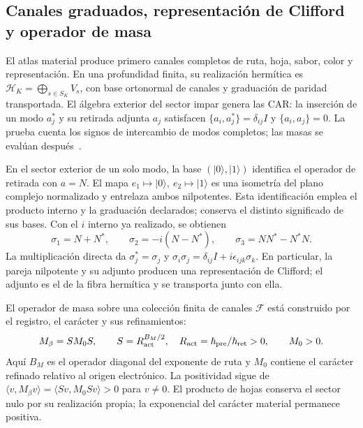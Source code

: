 \subsection{Canales graduados, representación de Clifford y operador de masa}

El atlas material produce primero canales completos de ruta, hoja, sabor,
color y representación. En una profundidad finita, su realización
hermítica es \(\mathcal H_K=\bigoplus_{s\in S_K}V_s\), con base
ortonormal de canales y graduación de paridad transportada. El álgebra
exterior del sector impar genera las CAR: la inserción de un modo
\(a_j^*\) y su retirada adjunta \(a_j\) satisfacen
\(\{a_i,a_j^*\}=\delta_{ij}I\) y \(\{a_i,a_j\}=0\).
La prueba cuenta los signos de intercambio de modos completos; las masas
se evalúan después~\cite{hmtVI}.

En el sector exterior de un solo modo, la base \((|0\rangle,|1\rangle)\)
identifica el operador de retirada con
\(a=N\). El mapa \(e_1\mapsto|0\rangle,\ e_2\mapsto|1\rangle\)
es una isometría del plano complejo normalizado y entrelaza ambos
nilpotentes. Esta identificación emplea el producto interno y la
graduación declarados; conserva el distinto significado de sus bases.
Con el \(i\) interno ya realizado, se obtienen
\begin{equation}
 \sigma_1=N+N^*,\qquad
 \sigma_2=-i(N-N^*),\qquad
 \sigma_3=NN^*-N^*N.
 \label{eq:hc-pauli}
\end{equation}
La multiplicación directa da
\(\sigma_j^*=\sigma_j\) y
\(\sigma_i\sigma_j=\delta_{ij}I+i\epsilon_{ijk}\sigma_k\).
En particular, la pareja nilpotente y su adjunto producen una
representación de Clifford; el adjunto es el de la fibra hermítica y
se transporta junto con ella.

El operador de masa sobre una colección finita de canales \(\mathcal F\)
está construido por el registro, el carácter y sus refinamientos:
\begin{equation}
 M_\beta=S M_0 S,\qquad
 S=R_{\rm act}^{B_M/2},\quad
 R_{\rm act}=\hbar_{\rm pre}/\hbar_{\rm ret}>0,
 \qquad M_0>0.
 \label{eq:hc-mass}
\end{equation}
Aquí \(B_M\) es el operador diagonal del exponente de ruta y \(M_0\)
contiene el carácter refinado relativo al origen electrónico.
La positividad sigue de \(\langle v,M_\beta v\rangle
=\langle Sv,M_0Sv\rangle>0\) para \(v\ne0\).
El producto de hojas conserva el sector nulo por su realización propia;
la exponencial del carácter material permanece positiva.

